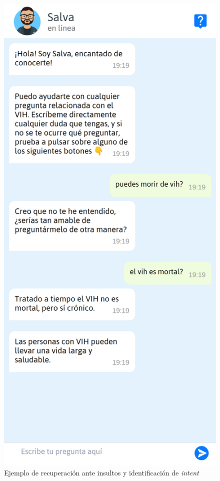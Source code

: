 \begin{figure}[htbp]
\includegraphics[scale=0.15]{../images/recover.png}
\caption{Ejemplo de recuperación ante insultos y identificación de \textit{intent}}
\label{fig:recover}
\end{figure}

